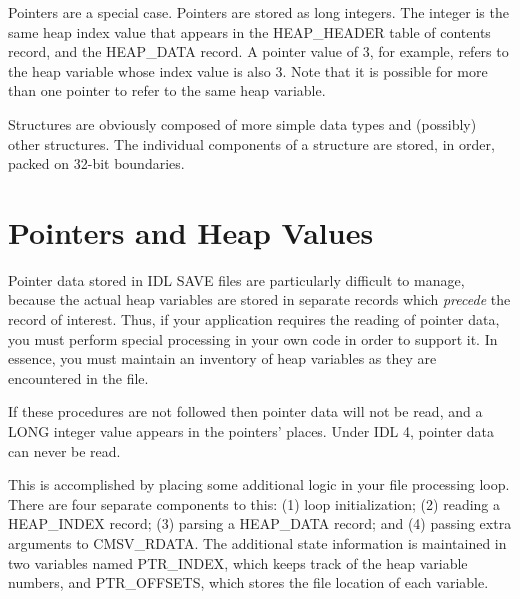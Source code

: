 \documentclass[12pt]{article}
\begin{document}
Pointers are a special case.  Pointers are stored as long integers.
The integer is the same heap index value that appears in the HEAP\_HEADER
table of contents record, and the HEAP\_DATA record.  A pointer value
of 3, for example, refers to the heap variable whose index value is
also 3.  Note that it is possible for more than one pointer to refer
to the same heap variable.

Structures are obviously composed of more simple data types and
(possibly) other structures.  The individual components of a structure
are stored, in order, packed on 32-bit boundaries.

\section{Pointers and Heap Values\label{s:pointer}}

Pointer data stored in IDL SAVE files are particularly difficult
to manage, because the actual heap variables are stored in
separate records which {\it precede\/} the record of interest.  Thus, if
your application requires the reading of pointer data, you must
perform special processing in your own code in order to support
it.  In essence, you must maintain an inventory of heap variables
as they are encountered in the file.

If these procedures are not followed then pointer data will not be
read, and a LONG integer value appears in the pointers' places.
Under IDL 4, pointer data can never be read.

This is accomplished by placing some additional logic in your file
processing loop.  There are four separate components to this: (1)
loop initialization; (2) reading a HEAP\_INDEX record; (3) parsing
a HEAP\_DATA record; and (4) passing extra arguments to CMSV\_RDATA.
The additional state information is maintained in two variables
named PTR\_INDEX, which keeps track of the heap variable numbers,
and PTR\_OFFSETS, which stores the file location of each variable.
\end{document}
